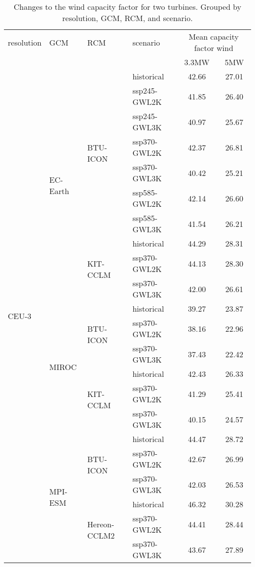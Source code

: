\begin{table}[!htbp]
\centering
\footnotesize
\caption{Changes to the wind capacity factor for two turbines. Grouped by resolution, GCM, RCM, and scenario.}
\label{Table:CF_Wind_changes}
\begin{tabular}{lll|l|cc}
\toprule
resolution & GCM & RCM & scenario & \multicolumn{2}{c}{Mean capacity factor wind} \\
 & & & & 3.3\si{\mega\watt} & 5\si{\mega\watt}  \\
\midrule
\multirow{22}{*}{CEU-3} & \multirow{10}{*}{EC-Earth} & \multirow{7}{*}{BTU-ICON} & historical & 42.66 & 27.01 \\
 &  &  & ssp245-GWL2K & 41.85 & 26.40 \\
 &  &  & ssp245-GWL3K & 40.97 & 25.67 \\
 &  &  & ssp370-GWL2K & 42.37 & 26.81 \\
 &  &  & ssp370-GWL3K & 40.42 & 25.21 \\
 &  &  & ssp585-GWL2K & 42.14 & 26.60 \\
 &  &  & ssp585-GWL3K & 41.54 & 26.21 \\
\cmidrule(lr){3-6}
 &  & \multirow{3}{*}{KIT-CCLM} & historical & 44.29 & 28.31 \\
 &  &  & ssp370-GWL2K & 44.13 & 28.30 \\
 &  &  & ssp370-GWL3K & 42.00 & 26.61 \\
\cmidrule(lr){3-6}
\cmidrule(lr){2-6}
 & \multirow{6}{*}{MIROC} & \multirow{3}{*}{BTU-ICON} & historical & 39.27 & 23.87 \\
 &  &  & ssp370-GWL2K & 38.16 & 22.96 \\
 &  &  & ssp370-GWL3K & 37.43 & 22.42 \\
\cmidrule(lr){3-6}
 &  & \multirow{3}{*}{KIT-CCLM} & historical & 42.43 & 26.33 \\
 &  &  & ssp370-GWL2K & 41.29 & 25.41 \\
 &  &  & ssp370-GWL3K & 40.15 & 24.57 \\
\cmidrule(lr){3-6}
\cmidrule(lr){2-6}
 & \multirow{6}{*}{MPI-ESM} & \multirow{3}{*}{BTU-ICON} & historical & 44.47 & 28.72 \\
 &  &  & ssp370-GWL2K & 42.67 & 26.99 \\
 &  &  & ssp370-GWL3K & 42.03 & 26.53 \\
\cmidrule(lr){3-6}
 &  & \multirow{3}{*}{Hereon-CCLM2} & historical & 46.32 & 30.28 \\
 &  &  & ssp370-GWL2K & 44.41 & 28.44 \\
 &  &  & ssp370-GWL3K & 43.67 & 27.89 \\

\end{tabular}
\end{table}
